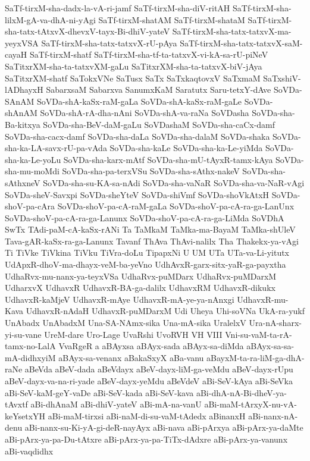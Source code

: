 {SaTf-tirxM-sha-dadx-la-vA-ri-jamf
SaTf-tirxM-sha-diV-ritAH
SaTf-tirxM-sha-lilxM-gA-va-dhA-ni-yAgi
SaTf-tirxM-shatAM
SaTf-tirxM-shataM
SaTf-tirxM-sha-tatx-tAtxvX-dhevxV-tayx-Bi-dhiV-yateV
SaTf-tirxM-sha-tatx-tatxvX-ma-yeyxVSA
SaTf-tirxM-sha-tatx-tatxvX-rU-pAya
SaTf-tirxM-sha-tatx-tatxvX-saM-cayaH
SaTf-tirxM-shatf
SaTf-tirxM-sha-tf-ta-tatxvX-vi-kA-sa-rU-piNeV
SaTitxrXM-sha-ta-tatxvXM-gaLu
SaTitxrXM-sha-ta-tatxvX-biV-jAya
SaTitxrXM-shatf
SaTokxVNe
SaTusx
SaTx
SaTxkaqtovxV
SaTxmaM
SaTxshiV-lADhayxH
SabarxsaM
Sabarxva
SanumxKaM
Saratutx
Saru-tetxY-dAve
SoVDa-SAnAM
SoVDa-shA-kaSx-raM-gaLa
SoVDa-shA-kaSx-raM-gaLe
SoVDa-shAnAM
SoVDa-shA-rA-dha-nAni
SoVDa-shA-va-raNa
SoVDasha
SoVDa-sha-Ba-kitxya
SoVDa-sha-BeV-daM-gaLu
SoVDashaM
SoVDa-sha-caCx-damf
SoVDa-sha-cacx-damf
SoVDa-sha-daLa
SoVDa-sha-dalaM
SoVDa-shaka
SoVDa-sha-ka-LA-savx-rU-pa-vAda
SoVDa-sha-kaLe
SoVDa-sha-ka-Le-yiMda
SoVDa-sha-ka-Le-yoLu
SoVDa-sha-karx-mAtf
SoVDa-sha-mU-tAyxR-tamx-kAya
SoVDa-sha-mu-moMdi
SoVDa-sha-pa-terxVSu
SoVDa-sha-sAthx-nakeV
SoVDa-sha-sAthxneV
SoVDa-sha-su-KA-sa-nAdi
SoVDa-sha-vaNaR
SoVDa-sha-va-NaR-vAgi
SoVDa-sheV-Savxpi
SoVDa-sheYteV
SoVDa-shiVmf
SoVDa-shoVkAtxH
SoVDa-shoV-pa-cAra
SoVDa-shoV-pa-cA-raM-gaLa
SoVDa-shoV-pa-cA-ra-ga-LanUnx
SoVDa-shoV-pa-cA-ra-ga-Lanunx
SoVDa-shoV-pa-cA-ra-ga-LiMda
SoVDhA
SwTx
TAdi-paM-cA-kaSx-rANi
Ta
TaMkaM
TaMka-ma-BayaM
TaMka-shUleV
Tava-gAR-kaSx-ra-ga-Lanunx
Tavanf
ThAva
ThAvi-nalilx
Tha
Thakekx-ya-vAgi
Ti
TiVke
TiVkina
TiVku
TiVra-doLu
TipapxNi
U
UM
UTa
UTa-va-Li-yitutx
UdApxR-dhoV-ma-dhayx-veM-ba-yeVno
UdhAvxR-garx-sitx-yaR-ga-payxtha
UdhaRvx-mu-nanx-ya-teyxVSa
UdhaRvx-puMDarx
UdhaRvx-puMDarxM
UdharxvX
UdhavxR
UdhavxR-BA-ga-dalilx
UdhavxRM
UdhavxR-dikukx
UdhavxR-kaMjeV
UdhavxR-mAye
UdhavxR-mA-ye-ya-nAnxgi
UdhavxR-mu-Kava
UdhavxR-nAdaH
UdhavxR-puMDarxM
Udi
Uheya
Uhi-soVNa
UkA-ra-yukf
UnAbadx
UnAbadxM
Una-SA-NAmx-sika
Una-mA-sika
UralelxV
Ura-nA-sharx-yi-su-vane
UreM-dare
Uro-Lage
UvaRshi
UvoRVH
VH
VIII
Vni-su-vaM-ta-rA-tamx-no-LalA
VvaRgeR
a
aBAyxsa
aBAyx-sada
aBAyx-sa-diMda
aBAyx-sa-sa-mA-didhxyiM
aBAyx-sa-venanx
aBakaSxyX
aBa-vanu
aBayxM-ta-ra-liM-ga-dhA-raNe
aBeVda
aBeV-dada
aBeVdayx
aBeV-dayx-liM-ga-veMdu
aBeV-dayx-rUpu
aBeV-dayx-va-na-ri-yade
aBeV-dayx-yeMdu
aBeVdeV
aBi-SeV-kAya
aBi-SeVka
aBi-SeV-kaM-geY-vaDe
aBi-SeV-kada
aBi-SeV-kava
aBi-dhA-nA-Bi-dheV-ya-tAvxtf
aBi-dhAnaM
aBi-dhiV-yateV
aBi-mA-na-vanU
aBi-maM-tArxyX-nu-vA-keYsetxYH
aBi-maM-tirxsi
aBi-naM-di-su-vaM-tAdedx
aBinanxH
aBi-nanx-nA-denu
aBi-nanx-su-Ki-yA-gi-deR-nayAyx
aBi-nava
aBi-pArxya
aBi-pArx-ya-daMte
aBi-pArx-ya-pa-Du-tAtxre
aBi-pArx-ya-pa-TiTx-dAdxre
aBi-pArx-ya-vanunx
aBi-vaqdidhx
}
